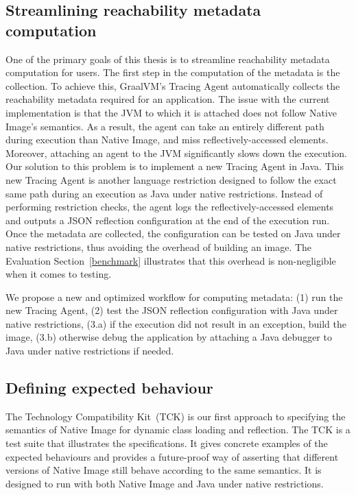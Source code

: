 \subsection{Streamlining reachability metadata computation}
One of the primary goals of this thesis is to streamline reachability metadata computation for users.
The first step in the computation of the metadata is the collection. To achieve this, GraalVM's Tracing Agent automatically collects the reachability metadata required for an application. The issue with the current implementation is that the JVM to which it is attached does not follow Native Image's semantics. As a result, the agent can take an entirely different path during execution than Native Image, and miss reflectively-accessed elements. Moreover, attaching an agent to the JVM significantly slows down the execution.
Our solution to this problem is to implement a new Tracing Agent in Java. This new Tracing Agent is another language restriction designed to follow the exact same path during an execution as Java under native restrictions. Instead of performing restriction checks, the agent logs the reflectively-accessed elements and outputs a JSON reflection configuration at the end of the execution run. 
Once the metadata are collected, the configuration can be tested on Java under native restrictions, thus avoiding the overhead of building an image. The Evaluation Section~\ref{benchmark} illustrates that this overhead is non-negligible when it comes to testing.  

We propose a new and optimized workflow for computing metadata: (1) run the new Tracing Agent, (2) test the JSON reflection configuration with Java under native restrictions, (3.a) if the execution did not result in an exception, build the image, (3.b) otherwise debug the application by attaching a Java debugger to Java under native restrictions if needed.

\subsection{Defining expected behaviour}
The Technology Compatibility Kit~(TCK) is our first approach to specifying the semantics of Native Image for dynamic class loading and reflection. The TCK is a test suite that illustrates the specifications. It gives concrete examples of the expected behaviours and provides a future-proof way of asserting that different versions of Native Image still behave according to the same semantics.
It is designed to run with both Native Image and Java under native restrictions.

